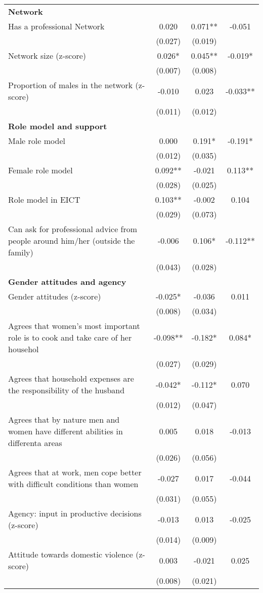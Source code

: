 \begin{longtable}{m{9cm}ccc}
\textbf{Network}&&&\\
Has a professional Network&0.020&0.071**&   -0.051\\
&(0.027)&(0.019)&\\
Network size (z-score)&0.026*&0.045**&   -0.019*\\
&(0.007)&(0.008)&\\
Proportion of males in the network (z-score)&-0.010&0.023&   -0.033**\\
&(0.011)&(0.012)&\\
\textbf{Role model and support}&&&\\
Male role model&0.000&0.191*&   -0.191*\\
&(0.012)&(0.035)&\\
Female role model&0.092**&-0.021&    0.113**\\
&(0.028)&(0.025)&\\
Role model in EICT&0.103**&-0.002&    0.104\\
&(0.029)&(0.073)&\\
Can ask for professional advice from people around him/her (outside the family) &-0.006&0.106*&   -0.112**\\
&(0.043)&(0.028)&\\
\textbf{Gender attitudes and agency}&&&\\
Gender attitudes (z-score)&-0.025*&-0.036&    0.011\\
&(0.008)&(0.034)&\\
Agrees that women’s most important role is to cook and take care of her househol&-0.098**&-0.182*&    0.084*\\
&(0.027)&(0.029)&\\
Agrees that household expenses are the responsibility of the husband&-0.042*&-0.112*&    0.070\\
&(0.012)&(0.047)&\\
Agrees that by nature men and women have different abilities in differenta areas&0.005&0.018&   -0.013\\
&(0.026)&(0.056)&\\
Agrees that at work, men cope better with difficult conditions than women&-0.027&0.017&   -0.044\\
&(0.031)&(0.055)&\\
Agency: input in productive decisions (z-score)&-0.013&0.013&   -0.025\\
&(0.014)&(0.009)&\\
Attitude towards domestic violence (z-score)&0.003&-0.021&    0.025\\
&(0.008)&(0.021)&\\

\end{longtable}
